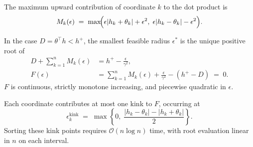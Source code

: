 \documentclass{article}
\theoremstyle{plain}
\theoremstyle{definition}
\theoremstyle{remark}
\begin{document}
The maximum upward contribution of coordinate $k$ to the dot product is
\begin{equation}
\label{eq:bilinf-Mk}
  M_k(\epsilon)
    \;=\; \max\!\Bigl(
      \epsilon|h_k+\theta_{k}|+\epsilon^2,\;
      \epsilon|h_k-\theta_{k}|-\epsilon^2
    \Bigr).
\end{equation}

In the case $D=\theta^\top h < h^{+}$, the smallest feasible radius $\epsilon^*$ is
the unique positive root of
\begin{equation}
\label{eq:bilinf-root}
\begin{aligned}
    D+\sum_{k=1}^{n} M_k(\epsilon)
      &= h^{+}  - \frac{\epsilon}{\gamma^2}, \\
    F(\epsilon)
      &= \sum_{k=1}^{n} M_k(\epsilon) + \frac{\epsilon}{\gamma^2} - (h^{+} - D)
      \;=\; 0.
\end{aligned}
\end{equation}
$F$ is continuous, strictly monotone increasing, and piecewise quadratic
in $\epsilon$.

Each coordinate contributes at most one kink to $F$, occurring at
\[
  \epsilon_k^{\mathrm{kink}}
    \;=\; \max\!\left\{0,\;
      \frac{|h_k-\theta_{k}|-|h_k+\theta_{k}|}{2}
    \right\}.
\]
Sorting these kink points requires $\mathcal{O}(n\log n)$ time, with root
evaluation linear in $n$ on each interval.
\end{document}
